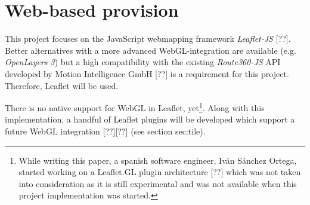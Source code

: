   \section{Web-based provision}
    \label{sec:requr:websd}
    This project focuses on the JavaScript webmapping framework \textit{Leaflet-JS} [??]. Better alternatives with a more advanced WebGL-integration are available (e.g. \textit{OpenLayers 3}) but a high compatibility with the existing \textit{Route360-JS} API developed by Motion Intelligence GmbH [??] is a requirement for this project. Therefore, Leaflet will be used.\par
    There is no native support for WebGL in Leaflet, yet\footnote{While writing this paper, a spanish software engineer, Iván Sánchez Ortega, started working on a Leaflet.GL plugin architecture [??] which was not taken into consideration as it is still experimental and was not available when this project implementation was started.}. Along with this implementation, a handful of Leaflet plugins will be developed which support a future WebGL integration [??][??] (see section {sec:tile}).\par
